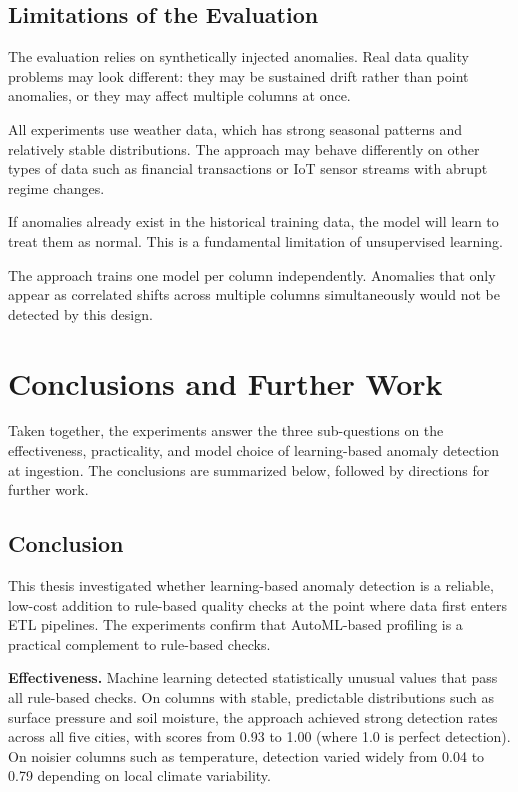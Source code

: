 \documentclass[12pt]{article}
\begin{document}
\subsection{Limitations of the Evaluation}

The evaluation relies on synthetically injected anomalies. Real data quality problems may look different: they may be sustained drift rather than point anomalies, or they may affect multiple columns at once.

All experiments use weather data, which has strong seasonal patterns and relatively stable distributions. The approach may behave differently on other types of data such as financial transactions or IoT sensor streams with abrupt regime changes.

If anomalies already exist in the historical training data, the model will learn to treat them as normal. This is a fundamental limitation of unsupervised learning.

The approach trains one model per column independently. Anomalies that only appear as correlated shifts across multiple columns simultaneously would not be detected by this design.


\section{Conclusions and Further Work}\label{sec:conclusions}

Taken together, the experiments answer the three sub-questions on the effectiveness, practicality, and model choice of learning-based anomaly detection at ingestion. The conclusions are summarized below, followed by directions for further work.

\subsection{Conclusion}

This thesis investigated whether learning-based anomaly detection is a reliable, low-cost addition to rule-based quality checks at the point where data first enters ETL pipelines. The experiments confirm that AutoML-based profiling is a practical complement to rule-based checks.

\textbf{Effectiveness.} Machine learning detected statistically unusual values that pass all rule-based checks. On columns with stable, predictable distributions such as surface pressure and soil moisture, the approach achieved strong detection rates across all five cities, with scores from 0.93 to 1.00 (where 1.0 is perfect detection). On noisier columns such as temperature, detection varied widely from 0.04 to 0.79 depending on local climate variability.
\end{document}
